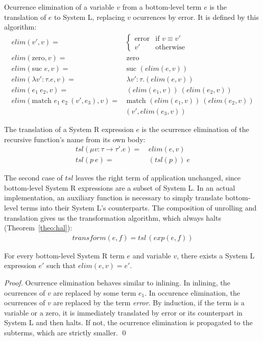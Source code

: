 \documentclass[runningheads]{llncs}
\begin{document}
\begin{definition}\label{def:rec}
Ocurrence elimination of a variable $v$ from a bottom-level term $e$ is the translation of $e$ to System L, replacing $v$ ocurrences by error. It is defined by this algorithm:
\begin{align*}
elim(v', v) =& \begin{cases}
  \text{error} & \text{if }v \equiv v'\\
  v' & \text{otherwise}
\end{cases}\\
elim(\text{zero}, v) =& \, \text{zero}\\
elim(\text{suc }e, v) =& \, \text{suc }(elim(e, v))\\
elim(\lambda v' : \tau . e, v) =& \, \lambda v' : \tau . (elim(e, v))\\
elim(e_1 \: e_2, v) =& \, (elim(e_1, v)) \: (elim(e_2, v))\\
elim(\text{match }e_1 \: e_2 \: (v', e_3), v) =& \, \text{match }(elim(e_1, v)) \: (elim(e_2, v)) \\ & (v', elim(e_3, v))
\end{align*}
\end{definition}

\begin{definition}\label{def:rec2}
The translation of a System R expression $e$ is the ocurrence  
elimination of the recursive function's name from its own body:
\begin{align*}
tsl(\mu v : \tau \rightarrow \tau' . e) =& \, elim(e, v)\\
tsl(p \: e) =& \, (tsl(p)) \: e
\end{align*}
\end{definition}

\noindent The second case of $tsl$ leaves the right term of 
application unchanged, since bottom-level System R 
expressions are a subset of System L. In an actual 
implementation, an auxiliary function is necessary to 
simply translate bottom-level terms into their System 
L's counterparts. The composition of 
unrolling and translation gives us the transformation algorithm, which always halts (Theorem~\ref{theo:hal}):
\begin{align*}
\mathit{transform}(e, f) = tsl \, (exp(e, f))
\end{align*}

\begin{lemma}\label{lem:hal}
For every bottom-level System R term
$e$ and variable $v$, there exists a System L 
expression $e'$ such that ${elim(e, v)=e'}$.\end{lemma}
\begin{proof}
Ocurrence elimination behaves similar to 
inlining. In inlining, the ocurrences of $v$ are replaced by 
some term $e_1$. In occurence elimination, the ocurrences of $v$ are replaced 
by the term {\it error}.
By induction,
if the term is a variable or a zero, it is 
immediately translated by error or its 
counterpart in System L and then halts.
If not, the ocurrence elimination is propagated to the 
subterms, which are strictly smaller. \qed
\end{proof}
\end{document}
